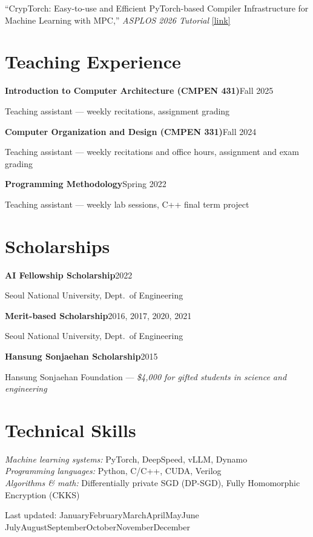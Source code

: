 \documentclass[11pt,letterpaper]{article}
\newcommand{\entry}[2]{\textbf{#1}\hfill #2\par}
\newcommand{\monthyear}{%
  \ifcase\month\or January\or February\or March\or April\or May\or June\or
  July\or August\or September\or October\or November\or December\fi\ \the\year}
\begin{document}
``CrypTorch: Easy-to-use and Efficient PyTorch-based Compiler Infrastructure for
Machine Learning with MPC,'' \textit{ASPLOS 2026 Tutorial}
\href{https://sites.google.com/view/cryptorch-asplos-2026-tutorial}{[link]}

\section{Teaching Experience}

\entry{Introduction to Computer Architecture (CMPEN 431)}{Fall 2025}
Teaching assistant --- weekly recitations, assignment grading

\vspace{0.5em}
\entry{Computer Organization and Design (CMPEN 331)}{Fall 2024}
Teaching assistant --- weekly recitations and office hours, assignment and exam grading

\vspace{0.5em}
\entry{Programming Methodology}{Spring 2022}
Teaching assistant --- weekly lab sessions, C++ final term project

\section{Scholarships}

\entry{AI Fellowship Scholarship}{2022}
Seoul National University, Dept.\ of Engineering

\vspace{0.5em}
\entry{Merit-based Scholarship}{2016, 2017, 2020, 2021}
Seoul National University, Dept.\ of Engineering

\vspace{0.5em}
\entry{Hansung Sonjaehan Scholarship}{2015}
Hansung Sonjaehan Foundation --- \textit{\$4{,}000 for gifted students in science and
engineering}

\section{Technical Skills}

\textit{Machine learning systems:} PyTorch, DeepSpeed, vLLM, Dynamo \\
\textit{Programming languages:} Python, C/C++, CUDA, Verilog \\
\textit{Algorithms \& math:} Differentially private SGD (DP-SGD), Fully Homomorphic
Encryption (CKKS)

\vfill
\begin{center}
  \footnotesize\color{gray} Last updated: \monthyear
\end{center}
\end{document}
